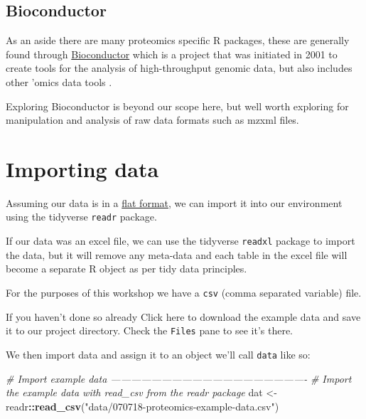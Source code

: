 \documentclass[12pt,]{book}
\newenvironment{Shaded}{\begin{snugshade}}{\end{snugshade}}
\newcommand{\CommentTok}[1]{\textcolor[rgb]{0.56,0.35,0.01}{\textit{#1}}}
\newcommand{\KeywordTok}[1]{\textcolor[rgb]{0.13,0.29,0.53}{\textbf{#1}}}
\newcommand{\NormalTok}[1]{#1}
\newcommand{\OperatorTok}[1]{\textcolor[rgb]{0.81,0.36,0.00}{\textbf{#1}}}
\newcommand{\StringTok}[1]{\textcolor[rgb]{0.31,0.60,0.02}{#1}}
\begin{document}
\hypertarget{biocondutor}{%
\subsection{Bioconductor}\label{biocondutor}}

As an aside there are many proteomics specific R packages, these are generally
found through \href{https://www.bioconductor.org/}{Bioconductor} which is a project
that was initiated in 2001 to create tools for the analysis of high-throughput
genomic data, but also includes other 'omics data tools \citep[\citet{huber2015}]{gentleman2004}.

Exploring Bioconductor is beyond our scope here, but well worth exploring for
manipulation and analysis of raw data formats such as mzxml files.

\hypertarget{importing-data}{%
\section{Importing data}\label{importing-data}}

Assuming our data is in a \protect\hyperlink{file-formats}{flat format}, we can import it into our
environment using the tidyverse \texttt{readr} package.

If our data was an excel file, we can use the tidyverse \texttt{readxl} package to
import the data, but it will remove any meta-data and each table in the excel
file will become a separate R object as per tidy data principles.

For the purposes of this workshop we have a \texttt{csv} (comma separated variable) file.

If you haven't done so already
Click here to download the example data and save it to our project
directory. Check the \texttt{Files} pane to see it's there.

We then import data and assign it to an object we'll call \texttt{data} like so:

\begin{Shaded}
\begin{Highlighting}[]
\CommentTok{# Import example data ----------------------------------------------------------}
\CommentTok{# Import the example data with read_csv from the readr package}
\NormalTok{dat <-}\StringTok{ }\NormalTok{readr}\OperatorTok{::}\KeywordTok{read_csv}\NormalTok{(}\StringTok{"data/070718-proteomics-example-data.csv"}\NormalTok{)}
\end{Highlighting}
\end{Shaded}
\end{document}
